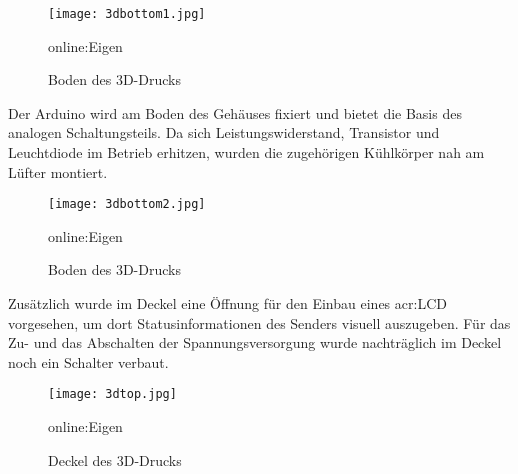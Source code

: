 \begin{figure}[H]
	\centering
	\texttt{[image: 3dbottom1.jpg]}
	\caption[Boden des 3D-Drucks]{Boden des 3D-Drucks} \gls{online:Eigen}
	\label{fig:3dbottom1}
\end{figure}

Der Arduino wird am Boden des Gehäuses fixiert und bietet die Basis des analogen Schaltungsteils.
Da sich Leistungswiderstand, Transistor und Leuchtdiode im Betrieb erhitzen, wurden die zugehörigen Kühlkörper nah am Lüfter montiert.

\begin{figure}[H]
	\centering
	\texttt{[image: 3dbottom2.jpg]}
	\caption[Boden des 3D-Drucks]{Boden des 3D-Drucks} \gls{online:Eigen}
	\label{fig:3dbottom2}
\end{figure}

Zusätzlich wurde im Deckel eine Öffnung für den Einbau eines \gls{acr:LCD} vorgesehen, um dort Statusinformationen des Senders visuell auszugeben. Für das Zu- und das Abschalten der Spannungsversorgung wurde nachträglich im Deckel noch ein Schalter verbaut.

\begin{figure}[H]
	\centering
	\texttt{[image: 3dtop.jpg]}
	\caption[Deckel des 3D-Drucks]{Deckel des 3D-Drucks} \gls{online:Eigen}
	\label{fig:3dtop}
\end{figure}





